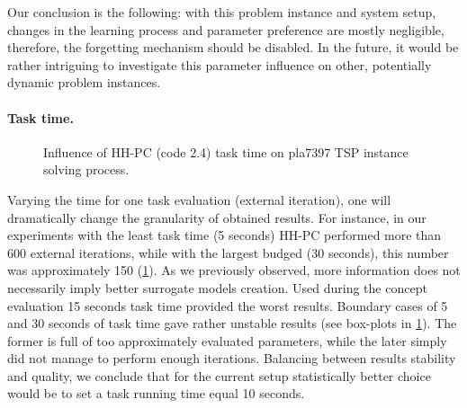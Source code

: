 Our conclusion is the following: with this problem instance and system setup, changes in the learning process and parameter preference are mostly negligible, therefore, the forgetting mechanism should be disabled. In the future, it would be rather intriguing to investigate this parameter influence on other, potentially dynamic problem instances.

\paragraph{Task time.}
\begin{figure}[h]
	\centering
	\vspace{-20pt}
	
	\caption{Influence of HH-PC (code 2.4) task time on pla7397 TSP instance solving process.}
	\vspace{-5pt}
	\label{eval:2:pict:task time}
\end{figure}
Varying the time for one task evaluation (external iteration), one will dramatically change the granularity of obtained results. For instance, in our experiments with the least task time (5 seconds) HH-PC performed more than 600 external iterations, while with the largest budged (30 seconds), this number was approximately 150 (\cref{eval:2:pict:task time}). As we previously observed, more information does not necessarily imply better surrogate models creation. Used during the concept evaluation 15 seconds task time provided the worst results. Boundary cases of 5 and 30 seconds of task time gave rather unstable results (see box-plots in \cref{eval:2:pict:task time}). The former is full of too approximately evaluated parameters, while the later simply did not manage to perform enough iterations. Balancing between results stability and quality, we conclude that for the current setup statistically better choice would be to set a task running time equal 10 seconds. 


